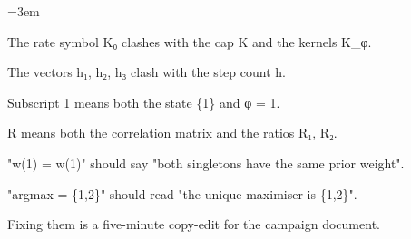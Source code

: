 \documentclass[11pt]{report}
\newenvironment{mdblock}{\begingroup\mdfont\raggedright\setlength{\parindent}{0pt}\setlength{\parskip}{0.55em}\emergencystretch=3em}{\par\endgroup}
\begin{document}
\begin{mdblock}
\begin{mdbul}
\begin{mdbul}
\item The rate symbol K₀ clashes with the cap K and the kernels K\_φ.
\item The vectors h₁, h₂, h₃ clash with the step count h.
\item Subscript 1 means both the state \{1\} and φ = 1.
\item R means both the correlation matrix and the ratios R₁, R₂.
\item "w(1) = w(1)" should say "both singletons have the same prior weight".
\item "argmax = \{1,2\}" should read "the unique maximiser is \{1,2\}".
\end{mdbul}

Fixing them is a five-minute copy-edit for the campaign document.
\end{mdbul}
\end{mdblock}
\end{document}
